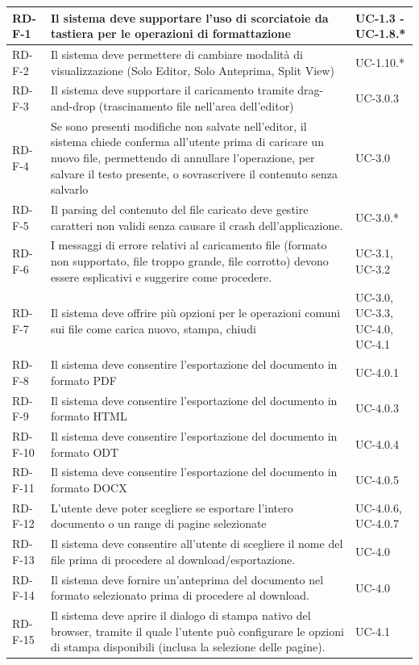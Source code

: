 \documentclass[11pt,a4paper]{article}
\begin{document}
\begin{longtable}{|p{}|>{\raggedright\arraybackslash}p{}|p{}|}
RD-F-1 & Il sistema deve supportare l'uso di scorciatoie da tastiera per le operazioni di formattazione & UC-1.3 - UC-1.8.* \\
\hline
RD-F-2 & Il sistema deve permettere di cambiare modalità di visualizzazione (Solo Editor, Solo Anteprima, Split View) & UC-1.10.* \\
\hline
RD-F-3 & Il sistema deve supportare il caricamento tramite drag-and-drop (trascinamento file nell'area dell'editor) & UC-3.0.3 \\
\hline
RD-F-4 & Se sono presenti modifiche non salvate nell'editor, il sistema chiede conferma all'utente prima di caricare un nuovo file, permettendo di annullare l'operazione, per salvare il testo presente, o sovrascrivere il contenuto senza salvarlo & UC-3.0 \\
\hline
RD-F-5 & Il parsing del contenuto del file caricato deve gestire caratteri non validi senza causare il crash dell'applicazione. & UC-3.0.* \\
\hline
RD-F-6 & I messaggi di errore relativi al caricamento file (formato non supportato, file troppo grande, file corrotto) devono essere esplicativi e suggerire come procedere. & UC-3.1, UC-3.2 \\
\hline
RD-F-7 & Il sistema deve offrire più opzioni per le operazioni comuni sui file come carica nuovo, stampa, chiudi & UC-3.0, UC-3.3, UC-4.0, UC-4.1\\
\hline
RD-F-8 & Il sistema deve consentire l'esportazione del documento in formato PDF & UC-4.0.1 \\
\hline
RD-F-9 & Il sistema deve consentire l'esportazione del documento in formato HTML & UC-4.0.3 \\
\hline
RD-F-10 & Il sistema deve consentire l'esportazione del documento in formato ODT & UC-4.0.4 \\
\hline
RD-F-11 & Il sistema deve consentire l'esportazione del documento in formato DOCX & UC-4.0.5 \\
\hline
RD-F-12 & L'utente deve poter scegliere se esportare l'intero documento o un range di pagine selezionate & UC-4.0.6, UC-4.0.7\\
\hline
RD-F-13 & Il sistema deve consentire all'utente di scegliere il nome del file prima di procedere al download/esportazione. & UC-4.0 \\
\hline
RD-F-14 & Il sistema deve fornire un'anteprima del documento nel formato selezionato prima di procedere al download. & UC-4.0 \\
\hline
RD-F-15 & Il sistema deve aprire il dialogo di stampa nativo del browser, tramite il quale l'utente può configurare le opzioni di stampa disponibili (inclusa la selezione delle pagine). & UC-4.1 \\
\hline


\end{longtable}
\end{document}
